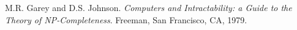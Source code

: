 \begin{thebibliography}{9}

M.R. Garey and D.S. Johnson.
\emph{Computers and Intractability: a Guide to the Theory of NP-Completeness}.
Freeman, San Francisco, CA, 1979.

\end{thebibliography}
